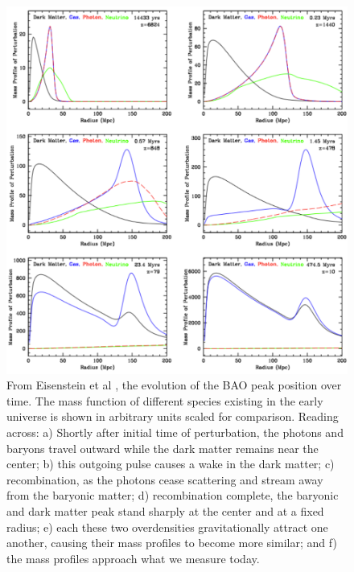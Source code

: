 \documentclass[12pt]{article}
\begin{document}
\begin{figure}[H]
	\centering
	\includegraphics[width=13cm]{peakEvol}
	\caption{From Eisenstein et al \cite{Eisensteinetal}, the evolution of the BAO peak position over time. The mass function of different species existing in the early universe is shown in arbitrary units scaled for comparison. Reading across: a) Shortly after initial time of perturbation, the photons and baryons travel outward while the dark matter remains near the center; b) this outgoing pulse causes a wake in the dark matter; c) recombination, as the photons cease scattering and stream away from the baryonic matter; d) recombination complete, the baryonic and dark matter peak stand sharply at the center and at a fixed radius; e) each these two overdensities gravitationally attract one another, causing their mass profiles to become more similar; and f) the mass profiles approach what we measure today.}
	\label{peakEvol}
\end{figure}
\end{document}
